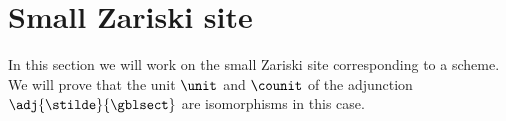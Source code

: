 \section{Small Zariski site}

In this section we will work on the small Zariski site corresponding to a scheme.
We will prove that the unit $\unit$ and $\counit$ of the adjunction $\adj{\stilde}{\gblsect}$
are isomorphisms in this case.


